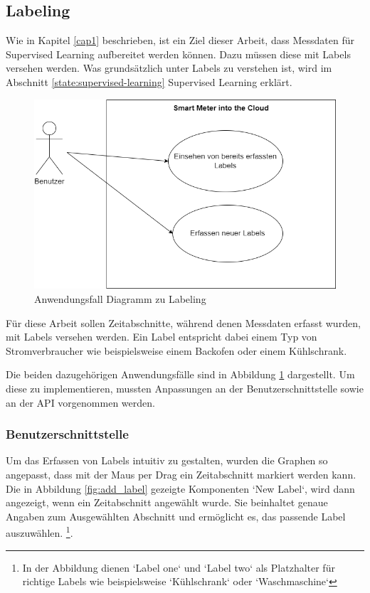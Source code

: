 \subsection{Labeling}
Wie in Kapitel \ref{cap1} beschrieben, ist ein Ziel dieser Arbeit,
dass Messdaten für Supervised Learning aufbereitet werden können.
Dazu müssen diese mit Labels versehen werden.
Was grundsätzlich unter Labels zu verstehen ist, wird im Abschnitt \ref{state:supervised-learning} Supervised Learning erklärt.
\begin{figure}[H]
    \centering
    \includegraphics[width=1.0\textwidth]{gfx/labeling.drawio}
    \caption{Anwendungsfall Diagramm zu Labeling}
    \label{fig:labeling}
\end{figure}
Für diese Arbeit sollen Zeitabschnitte, während denen Messdaten erfasst wurden, mit Labels versehen werden.
Ein Label entspricht dabei einem Typ von Stromverbraucher wie beispielsweise einem Backofen oder einem Kühlschrank.

Die beiden dazugehörigen Anwendungsfälle sind in Abbildung \ref{fig:labeling} dargestellt.
Um diese zu implementieren,
mussten Anpassungen an der Benutzerschnittstelle sowie an der \ac{API} vorgenommen werden.

\subsubsection{Benutzerschnittstelle}
Um das Erfassen von Labels intuitiv zu gestalten,
wurden die Graphen so angepasst, dass mit der Maus per Drag ein Zeitabschnitt markiert werden kann.
Die in Abbildung \ref{fig:add_label} gezeigte Komponenten `New Label`, wird dann angezeigt, wenn ein Zeitabschnitt angewählt wurde.
Sie beinhaltet genaue Angaben zum Ausgewählten Abschnitt
und ermöglicht es, das passende Label auszuwählen. \footnote{
    In der Abbildung dienen `Label one` und `Label two` als Platzhalter für richtige Labels wie beispielsweise `Kühlschrank` oder `Waschmaschine`}.

